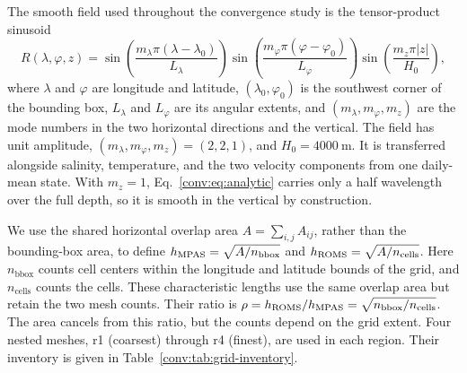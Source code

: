 The smooth field used throughout the convergence study is the tensor-product sinusoid
\begin{equation}
 R(\lambda,\varphi,z)=\sin\!\left(\frac{m_\lambda\pi(\lambda-\lambda_0)}{L_\lambda}\right)
 \sin\!\left(\frac{m_\varphi\pi(\varphi-\varphi_0)}{L_\varphi}\right)
 \sin\!\left(\frac{m_z\pi|z|}{H_0}\right),
 \label{conv:eq:analytic}
\end{equation}
where $\lambda$ and $\varphi$ are longitude and latitude, $(\lambda_0,\varphi_0)$ is the southwest corner of the \ROMS bounding box, $L_\lambda$ and $L_\varphi$ are its angular extents, and $(m_\lambda,m_\varphi,m_z)$ are the mode numbers in the two horizontal directions and the vertical. The field has unit amplitude, $(m_\lambda,m_\varphi,m_z)=(2,2,1)$, and $H_0=\SI{4000}{\metre}$. It is transferred alongside salinity, temperature, and the two velocity components from one daily-mean \MPAS state. With $m_z=1$, Eq.~\eqref{conv:eq:analytic} carries only a half wavelength over the full depth, so it is smooth in the vertical by construction. %

We use the shared horizontal overlap area $A=\sum_{i,j}A_{ij}$, rather than the bounding-box area, to define $h_{\mathrm{MPAS}}=\sqrt{A/n_{\mathrm{bbox}}}$ and $h_{\mathrm{ROMS}}=\sqrt{A/n_{\mathrm{cells}}}$. Here $n_{\mathrm{bbox}}$ counts \MPAS cell centers within the longitude and latitude bounds of the \ROMS grid, and $n_{\mathrm{cells}}$ counts the \ROMS cells. These characteristic lengths use the same overlap area but retain the two mesh counts. Their ratio is $\rho=h_{\mathrm{ROMS}}/h_{\mathrm{MPAS}}=\sqrt{n_{\mathrm{bbox}}/n_{\mathrm{cells}}}$. The area cancels from this ratio, but the counts depend on the grid extent. Four nested \ROMS meshes, r1 (coarsest) through r4 (finest), are used in each region. Their inventory is given in Table~\ref{conv:tab:grid-inventory}.

